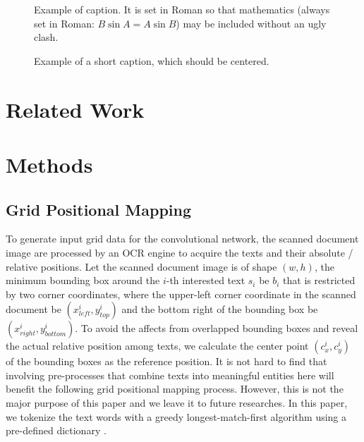 \documentclass[10pt,twocolumn,letterpaper]{article}
\begin{document}
\begin{figure}[t]
\begin{center}
\fbox{\rule{0pt}{2in} \rule{0.9\linewidth}{0pt}}
\end{center}
   \caption{Example of caption.  It is set in Roman so that mathematics
   (always set in Roman: $B \sin A = A \sin B$) may be included without an
   ugly clash.}
\label{fig:long}
\label{fig:onecol}
\end{figure}

\begin{figure*}
\begin{center}
\fbox{\rule{0pt}{2in} \rule{.9\linewidth}{0pt}}
\end{center}
   \caption{Example of a short caption, which should be centered.}
\label{fig:short}
\end{figure*}

\section{Related Work}

\section{Methods}
\subsection{Grid Positional Mapping}
To generate input grid data for the convolutional network, the scanned document image are processed by an OCR engine to acquire the texts and their absolute / relative positions. Let the scanned document image is of shape $(w, h)$, the minimum bounding box around the $i$-th interested text $s_i$ be $b_i$ that is restricted by two corner coordinates, where the upper-left corner coordinate in the scanned document be $(x^i_{left}, y^i_{top})$ and the bottom right of the bounding box be $(x^i_{right}, y^i_{bottom})$. To avoid the affects from overlapped bounding boxes and reveal the actual relative position among texts, we calculate the center point $(c^i_x, c^i_y)$ of the bounding boxes as the reference position. It is not hard to find that involving pre-processes that combine texts into meaningful entities here will benefit the following grid positional mapping process. However, this is not the major purpose of this paper and we leave it to future researches. In this paper, we tokenize the text words with a greedy longest-match-first algorithm using a pre-defined dictionary \cite{bertgit}. 
\end{document}
